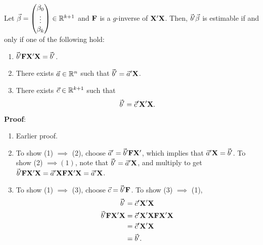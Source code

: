 \begin{Theorem}{}{}
    Let $ \vec{\beta}=\begin{pmatrix}
            \beta_0 \\
            \vdots  \\
            \beta_k
        \end{pmatrix}\in\mathbb{R}^{k+1} $ and $ \mathbf{F} $ is a $ g $-inverse
    of $ \mathbf{X}'\mathbf{X} $. Then,
    $ \vec{b}'\vec{\beta} $ is estimable if and only if one of the following hold:
    \begin{enumerate}[(1)]
        \item $ \vec{b}'\mathbf{F}\mathbf{X}'\mathbf{X}=\vec{b}' $.
        \item There exists $ \vec{a}\in\mathbb{R}^{n} $ such that $ \vec{b}'=\vec{a}'\mathbf{X} $.
        \item There exists $ \vec{c}\in\mathbb{R}^{k+1} $ such that
              \[ \vec{b}'=\vec{c}'\mathbf{X}'\mathbf{X}. \]
    \end{enumerate}
    \tcblower{}
    \textbf{Proof}:
    \begin{enumerate}[(1)]
        \item Earlier proof.
        \item To show (1) $\implies$ (2), choose $ \vec{a}'=\vec{b}'\mathbf{F}\mathbf{X}' $,
              which implies that $ \vec{a}'\mathbf{X}=\vec{b}' $.
              To show (2) $ \implies (1) $, note that $ \vec{b}'=\vec{a}'\mathbf{X} $,
              and multiply to get $ \vec{b}'\mathbf{F}\mathbf{X}'\mathbf{X}=\vec{a}'\mathbf{X}\mathbf{F}\mathbf{X}'\mathbf{X}=\vec{a}'\mathbf{X} $.
        \item To show (1) $ \implies $ (3), choose $ \vec{c}=\vec{b}'\mathbf{F} $.
              To show (3) $ \implies $ (1),
              \begin{align*}
                  \vec{b}'                                & =\vec{c}'\mathbf{X}'\mathbf{X}                                \\
                  \vec{b}'\mathbf{F}\mathbf{X}'\mathbf{X} & =\vec{c}'\mathbf{X}'\mathbf{X}\mathbf{F}\mathbf{X}'\mathbf{X} \\
                                                             & =\vec{c}'\mathbf{X}'\mathbf{X}                                \\
                                                             & =\vec{b}'.
              \end{align*}
    \end{enumerate}
\end{Theorem}
